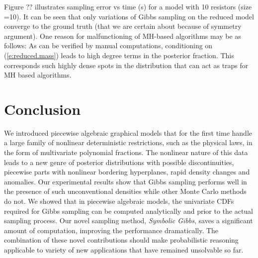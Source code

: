 \documentclass{article}
\begin{document}
{Figure ?? illustrates sampling error vs time (s) for a model with 10 resistors (size =10).
It can be seen that only variations of Gibbs sampling on the reduced model converge to the ground truth (that we are certain about because of symmetry argument). 
One reason for malfunctioning of MH-based algorithms may be as follows:
As can be verified by manual computations, conditioning on 
(\ref{e:reduced.mass}) leads to high degree terms in the posterior fraction. This corresponds such highly dense spots in the distribution that can act as traps for MH based algorithms.

 \section{Conclusion}
\label{sect:conclusion}

We introduced piecewise algebraic graphical models that for the first time handle a large family of nonlinear deterministic restrictions, such as the physical laws, in the form of multivariate polynomial fractions. The nonlinear nature of this data leads to a new genre of posterior distributions with possible discontinuities, 
piecewise parts with nonlinear bordering hyperplanes, rapid density changes and anomalies. Our experimental results show that Gibbs sampling performs well in the presence of such unconventional densities while other Monte Carlo methods do not. We showed that in piecewise algebraic models, the univariate CDFs required for Gibbs sampling can be computed analytically and prior to the actual sampling process. Our novel sampling method, \emph{Symbolic Gibbs}, saves a significant amount of computation, improving the performance dramatically. The combination of these novel contributions should make probabilistic reasoning applicable to variety of new applications that have remained unsolvable so far.      


}
\end{document}
